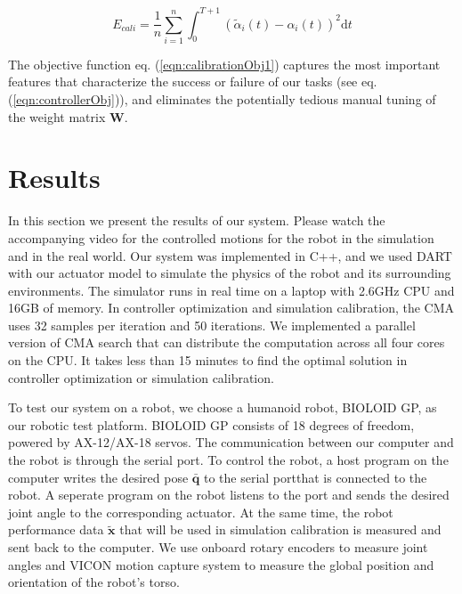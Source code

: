 \begin{equation}
  E_{cali}=\frac{1}{n}\sum_{i=1}^{n}\int_{0}^{T+1}(\tilde{\alpha}_i(t)-\alpha_i(t))^2\mathrm{d}t
  \label{eqn:calibrationObj1}
\end{equation}

The objective function eq. (\ref{eqn:calibrationObj1}) captures the most important features that characterize the success or failure of our tasks (see eq.(\ref{eqn:controllerObj})), and eliminates the potentially tedious manual tuning of the weight matrix $\mathbf{W}$.

\section{Results}
In this section we present the results of our system. Please watch the accompanying video for the controlled motions for the robot in the simulation and in the real world. Our system was implemented in C++, and we used DART with our actuator model to simulate the physics of the robot and its surrounding environments. The simulator runs in real time on a laptop with 2.6GHz CPU and 16GB of memory. In controller optimization and simulation calibration, the CMA uses 32 samples per iteration and 50 iterations. We implemented a parallel version of CMA search that can distribute the computation across all four cores on the CPU. It takes less than 15 minutes to find the optimal solution in controller optimization or simulation calibration.

To test our system on a robot, we choose a humanoid robot, BIOLOID GP, as our robotic test platform. BIOLOID GP consists of 18 degrees of freedom, powered by AX-12/AX-18 servos. The communication between our computer and the robot is through the serial port. To control the robot, a host program on the computer writes the desired pose $\bar{\mathbf{q}}$ to the serial portthat is connected to the robot. A seperate program on the robot listens to the port and sends the desired joint angle to the corresponding actuator. At the same time, the robot performance data $\tilde{\mathbf{x}}$ that will be used in simulation calibration is measured and sent back to the computer. We use onboard rotary encoders to measure joint angles and VICON motion capture system to measure the global position and orientation of the robot's torso.

